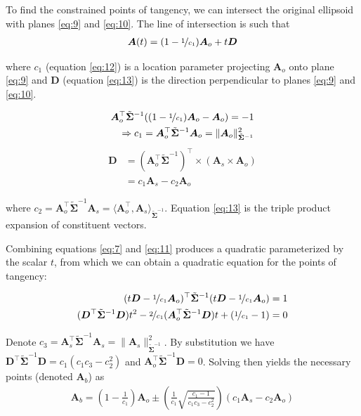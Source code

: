 \documentclass[preprint]{seismica}
\begin{document}
    \noindent To find the constrained points of tangency, we can intersect the original ellipsoid with planes
    \ref{eq:9} and \ref{eq:10}. The line of intersection is such that
    \begin{align} \label{eq:11}
      \bm{A}(t) = (1 - \nicefrac{1}{c_1}) \bm{A}_o + t\bm{D}
    \end{align}

    \noindent where $c_1$ (equation \ref{eq:12}) is a location parameter projecting $\bm{A}_o$ onto plane \ref{eq:9}
    and $\bm{D}$ (equation \ref{eq:13}) is the direction perpendicular to planes \ref{eq:9} and \ref{eq:10}. 

    \begin{align} \label{eq:12}
      \nonumber \bm{A}_o^\top \tilde{\bm{\Sigma}}^{-1} ((1 - \nicefrac{1}{c_1})\bm{A}_o - \bm{A}_o)  = -1\\
      \Rightarrow c_1 = \bm{A}_o^\top \tilde{\bm{\Sigma}}^{-1} \bm{A}_o = \|\bm{A}_o\|_{\tilde{\bm{\Sigma}}^{-1}}^2
    \end{align}
    \begin{align} \label{eq:13}
      \nonumber\bm{D} &= (\bm{A}_o^\top \tilde{\bm{\Sigma}}^{-1})^\top \times (\bm{A}_s \times \bm{A}_o)\\
        &= c_1\bm{A}_s - c_2\bm{A}_o
    \end{align}

    \noindent where $c_2 = \bm{A}_o^\top \tilde{\bm{\Sigma}}^{-1} \bm{A}_s = \langle\bm{A}_o^\top, \bm{A}_s\rangle_{\tilde{\bm{\Sigma}}^{-1}}$.
    Equation \ref{eq:13} is the triple product expansion of constituent vectors.

    \noindent Combining equations \ref{eq:7} and \ref{eq:11} produces a quadratic parameterized by the scalar $t$,
    from which we can obtain a quadratic equation for the points of tangency:

    \begin{align} \label{eq:14}
      \nonumber (t\bm{D} - \nicefrac{1}{c_1}\bm{A}_o)^\top \tilde{\bm{\Sigma}}^{-1} (t\bm{D} - \nicefrac{1}{c_1}\bm{A}_o)  = 1\\
      ({\bm{D}^\top \tilde{\bm{\Sigma}}^{-1} \bm{D}})t^2 - 
          \nicefrac{2}{c_1}(\bm{A}_o^\top \tilde{\bm{\Sigma}}^{-1} \bm{D})t + (\nicefrac{1}{c_1} - 1) = 0
    \end{align}

    \noindent Denote $c_3 = \bm{A}_s^\top \tilde{\bm{\Sigma}}^{-1} \bm{A}_s = \|\bm{A}_s\|_{\tilde{\bm{\Sigma}}^{-1}}^2$. By
    substitution we have
    ${\bm{D}^\top \tilde{\bm{\Sigma}}^{-1} \bm{D}} = c_1(c_1c_3 - c_2^2)$ and ${\bm{A}_o^\top \tilde{\bm{\Sigma}}^{-1} \bm{D}} = 0$.
    Solving then yields the necessary points (denoted $\bm{A}_b$) as
    \begin{align} \label{eq:15}
      \bm{A}_b = \left(1 - \frac{1}{c_1}\right)\bm{A}_o \pm
        \left(\frac{1}{c_1} \sqrt{\frac{c_1 - 1}{c_1c_3 - c_2^2}}\right)(c_1\bm{A}_s - c_2\bm{A}_o)
    \end{align}
\end{document}

